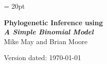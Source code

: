 \documentclass[11pt]{article}
\begin{document}
\renewcommand{\headrulewidth}{0.5pt}
\headsep = 20pt
\lhead{ }

\thispagestyle{plain}
\begin{center}

\textbf{\LARGE Phylogenetic Inference using \RevBayes}\\\vspace{2mm}
\textbf{\it{\Large A Simple Binomial Model}}\\\vspace{2mm}
\vspace{1cm}
{\Large Mike May and Brian Moore}
\vspace{1cm}
\end{center}

\def \ResourcePath {./}
\def \GlobalResourcePath {../}


Version dated: \today
\end{document}
